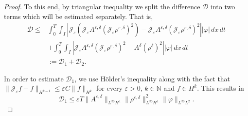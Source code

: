\documentclass[12pt]{amsart}
\newcommand{\Jrho}{\mathcal{J_\varepsilon}\rho^{\varepsilon,\delta}}
\newcommand{\JA}{\mathcal{J_\varepsilon}A^{\varepsilon,\delta}}
\newcommand{\D}{\,d}
\begin{document}
\begin{proof}
To this end, by triangular inequality we  split the difference $\mathcal{D}$ into two terms  which will be estimated  separately. That is,
\begin{equation*}
	\begin{split}
		\mathcal{D}\leq&
		\int_0^T\int_{I}|\mathcal{J_\varepsilon}(\JA (\Jrho)^2)-\JA (\Jrho)^2||\varphi| \D x \D t\\ &+\int_{0}^T\int_{I}|\JA (\Jrho)^2 -A^\delta(\rho^\delta)^2||\varphi|\D x \D t\\
		&:=\mathcal{D}_{1}+\mathcal{D}_{2}. 
	\end{split}
\end{equation*}




In order to estimate $\mathcal{D}_1$, we use Hölder's inequality along with the fact that $
			\|\mathcal{J_\varepsilon}f-f\|_{H^{k-1}}   \leq \varepsilon C\|f\|_{H^k}$ for every $\varepsilon>0$, $k\in \mathbb{N}$ and $f\in H^k$. This results in
\begin{equation*}
    \mathcal{D}_1\leq \varepsilon T\|A^{\varepsilon,\delta} \|_{L^\infty H^1}\|\rho^{\varepsilon,\delta}\|_{L^\infty H^1}^2\|\varphi\|_{L^\infty L^2}.
\end{equation*}



\end{proof}
\end{document}
